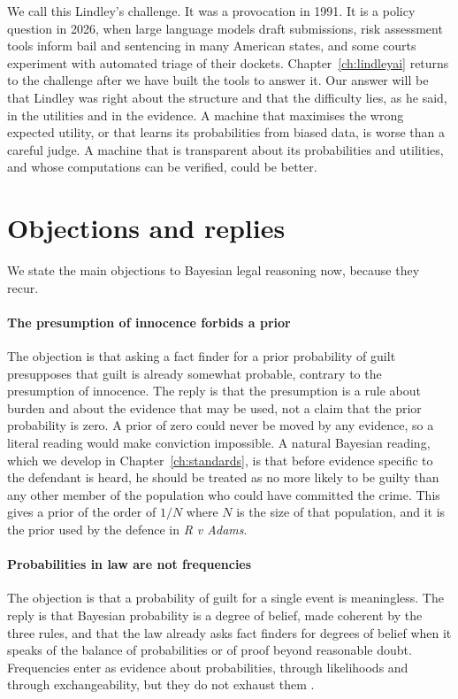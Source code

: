 We call this Lindley's challenge. It was a provocation in 1991. It is a policy question in 2026, when large language models draft submissions, risk assessment tools inform bail and sentencing in many American states, and some courts experiment with automated triage of their dockets. Chapter~\ref{ch:lindleyai} returns to the challenge after we have built the tools to answer it. Our answer will be that Lindley was right about the structure and that the difficulty lies, as he said, in the utilities and in the evidence. A machine that maximises the wrong expected utility, or that learns its probabilities from biased data, is worse than a careful judge. A machine that is transparent about its probabilities and utilities, and whose computations can be verified, could be better.

\section{Objections and replies}

We state the main objections to Bayesian legal reasoning now, because they recur.

\paragraph{The presumption of innocence forbids a prior} The objection is that asking a fact finder for a prior probability of guilt presupposes that guilt is already somewhat probable, contrary to the presumption of innocence. The reply is that the presumption is a rule about burden and about the evidence that may be used, not a claim that the prior probability is zero. A prior of zero could never be moved by any evidence, so a literal reading would make conviction impossible. A natural Bayesian reading, which we develop in Chapter~\ref{ch:standards}, is that before evidence specific to the defendant is heard, he should be treated as no more likely to be guilty than any other member of the population who could have committed the crime. This gives a prior of the order of $1/N$ where $N$ is the size of that population, and it is the prior used by the defence in \emph{R v Adams}.

\paragraph{Probabilities in law are not frequencies} The objection is that a probability of guilt for a single event is meaningless. The reply is that Bayesian probability is a degree of belief, made coherent by the three rules, and that the law already asks fact finders for degrees of belief when it speaks of the balance of probabilities or of proof beyond reasonable doubt. Frequencies enter as evidence about probabilities, through likelihoods and through exchangeability, but they do not exhaust them \citep{definetti1974,lindley2000}.

